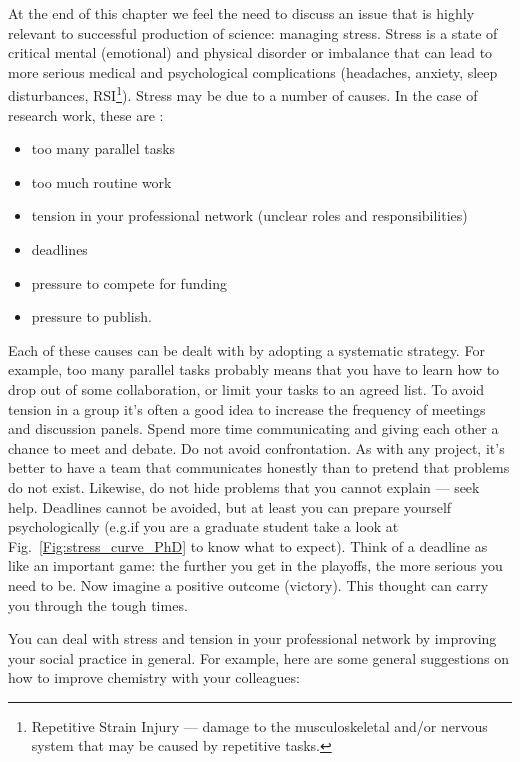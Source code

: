 \documentclass[graybox,envcountchap,sectrefs,UStrade]{svmono}
\begin{document}
At the end of this chapter we feel the need to discuss an issue that is highly relevant to successful production of science: managing stress. Stress is a state of critical mental (emotional) and physical disorder or imbalance that can lead to more serious medical and psychological complications (headaches, anxiety, sleep disturbances, RSI\footnote{Repetitive Strain Injury --- damage to the musculoskeletal and/or nervous system that may be caused by repetitive tasks.}). Stress may be due to a number of causes. In the case of research work, these are \citep{Bloomfield2008}:

\begin{itemize}
  \item too many parallel tasks
  \item too much routine work
  \item tension in your professional network (unclear roles and responsibilities)
  \item deadlines
  \item pressure to compete for funding
  \item pressure to publish.
\end{itemize}

Each of these causes can be dealt with by adopting a systematic strategy. For example, too many parallel tasks probably means that you have to learn how to drop out of some collaboration, or limit your tasks to an agreed list. To avoid tension in a group it's often a good idea to increase the frequency of meetings and discussion panels. Spend more time communicating and giving each other a chance to meet and debate. Do not avoid confrontation. As with any project, it's better to have a team that communicates honestly than to pretend that problems do not exist. Likewise, do not hide problems that you cannot explain --- seek help. Deadlines cannot be avoided, but at least you can prepare yourself psychologically (e.g.\@ if you are a graduate student take a look at Fig.\@~\ref{Fig:stress_curve_PhD} to know what to expect). Think of a deadline as like an important game: the further you get in the playoffs, the more serious you need to be. Now imagine a positive outcome (victory). This thought can carry you through the tough times.  \par

You can deal with stress and tension in your professional network by improving your social practice in general. For example, here are some general suggestions on how to improve chemistry with your colleagues:
\end{document}

